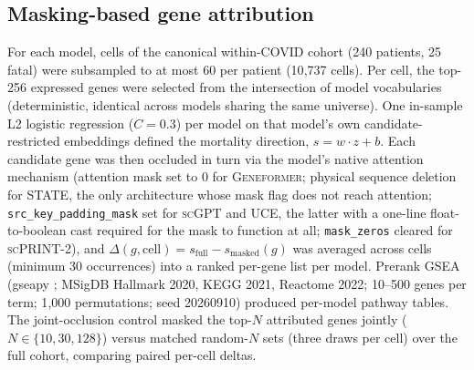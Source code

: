 \documentclass[11pt,a4paper]{article}
\newcommand{\model}[1]{\textsc{#1}}
\begin{document}
\subsection{Masking-based gene attribution}
\label{ssec:methods_masking}

For each model, cells of the canonical within-COVID cohort (240 patients, 25
fatal) were subsampled to at most 60 per patient (10{,}737 cells). Per cell,
the top-256 expressed genes were selected from the intersection of model
vocabularies (deterministic, identical across models sharing the same
universe). One in-sample L2 logistic regression ($C = 0.3$) per model on that
model's own candidate-restricted embeddings defined the mortality direction,
$s = w \cdot z + b$. Each candidate gene was then occluded in turn via the
model's native attention mechanism (attention mask set to 0 for
\model{Geneformer}; physical sequence deletion for \model{STATE}, the only
architecture whose mask flag does not reach attention;
\texttt{src\_key\_padding\_mask} set for \model{scGPT} and \model{UCE}, the
latter with a one-line float-to-boolean cast required for the mask to
function at all; \texttt{mask\_zeros} cleared for \model{scPRINT-2}), and
$\Delta(g, \text{cell}) = s_\text{full} - s_\text{masked}(g)$ was averaged
across cells (minimum 30 occurrences) into a ranked per-gene list per model.
Prerank GSEA \citep{subramanian2005gsea} (gseapy \citep{fang2023gseapy};
MSigDB Hallmark 2020, KEGG 2021, Reactome 2022; 10--500 genes per term;
1{,}000 permutations; seed 20260910) produced per-model pathway tables. The joint-occlusion control masked the top-$N$ attributed
genes jointly ($N \in \{10, 30, 128\}$) versus matched random-$N$ sets (three
draws per cell) over the full cohort, comparing paired per-cell deltas.
\end{document}
